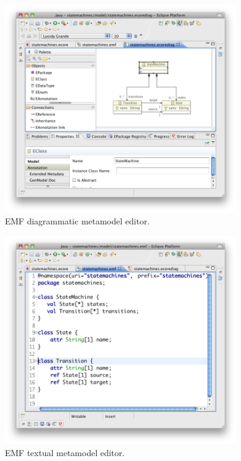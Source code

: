 \begin{figure}[htbp]
  \begin{center}
    \leavevmode
    \includegraphics[width=10cm]{2.Background/images/emf_metamodel_diagrammatic.png}
  \end{center}
  \caption{EMF diagrammatic metamodel editor.}
  \label{fig:emf_metamodel_editor_diagrammatic}
\end{figure}

\begin{figure}[htbp]
  \begin{center}
    \leavevmode
    \includegraphics[width=10cm]{2.Background/images/emf_metamodel_textual.png}
  \end{center}
  \caption{EMF textual metamodel editor.}
  \label{fig:emf_metamodel_editor_textual}
\end{figure}

